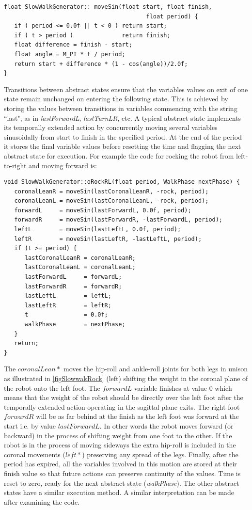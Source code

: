 \documentclass[pdftex,11pt,a4paper]{report}
\begin{document}
\begin{lstlisting}
float SlowWalkGenerator:: moveSin(float start, float finish,
                                         float period) {
   if ( period <= 0.0f || t < 0 ) return start;
   if ( t > period )              return finish;
   float difference = finish - start;
   float angle = M_PI * t / period;
   return start + difference * (1 - cos(angle))/2.0f;
}
\end{lstlisting}

Transitions between abstract states ensure that the variables values on exit of one state remain unchanged on entering the following state. This is achieved by storing the values between transitions in variables commencing with the string ``last", as in \emph{lastForwardL}, \emph{lastTurnLR}, etc. A typical abstract state implements its temporally extended action by concurrently moving several variables sinusoidally from start to finish in the specified period. At the end of the period it stores the final variable values before resetting the time and flagging the next abstract state for execution. For example the code for rocking the robot from left-to-right and moving forward is:

\begin{lstlisting}
void SlowWalkGenerator::oRockRL(float period, WalkPhase nextPhase) {
   coronalLeanR = moveSin(lastCoronalLeanR, -rock, period);
   coronalLeanL = moveSin(lastCoronalLeanL, -rock, period);
   forwardL     = moveSin(lastForwardL, 0.0f, period);
   forwardR     = moveSin(lastForwardR, -lastForwardL, period);
   leftL        = moveSin(lastLeftL, 0.0f, period);
   leftR        = moveSin(lastLeftR, -lastLeftL, period);
   if (t >= period) {
      lastCoronalLeanR = coronalLeanR;
      lastCoronalLeanL = coronalLeanL;
      lastForwardL     = forwardL;
      lastForwardR     = forwardR;
      lastLeftL        = leftL;
      lastLeftR        = leftR;
      t                = 0.0f;
      walkPhase        = nextPhase;
   }
   return;
}
\end{lstlisting}

The $coronalLean{*}$ moves the hip-roll and ankle-roll joints for both legs
in unison as illustrated in \autoref{figSlowwakRock} (left) shifting the
weight in the coronal plane of the robot onto the left foot. The $forwardL$
variable finishes at value 0 which means that the weight of the robot
should be directly over the left foot after the temporally extended action
operating in the sagittal plane exits. The right foot $forwardR$ will be as
far behind at the finish as the left foot was forward at the start i.e. by value $lastForwardL$. In other words the robot moves forward (or backward) in the process of shifting weight from one foot to the other. If the robot is in the process of moving sideways the extra hip-roll is included in the coronal movements ($left{*}$) preserving any spread of the legs.  Finally, after the period has expired, all the variables involved in this motion are stored at their finish value so that future actions can preserve continuity of the values. Time is reset to zero, ready for the next abstract state (\emph{walkPhase}). The other abstract states have a similar execution method.  A similar interpretation can be made after examining the code.  
\end{document}
